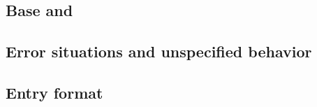 \subsection{Base and }
\label{qualifiers}

\subsection{Error situations and unspecified behavior}
\label{errorsituations}

\subsection{Entry format}





